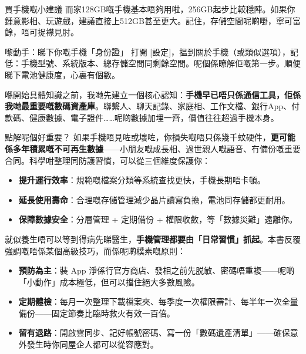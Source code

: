\begin{tcbinfo}{買手機嘅小建議}
而家128GB嘅手機基本唔夠用啦，256GB起步比較穩陣。如果你鍾意影相、玩遊戲，建議直接上512GB甚至更大。記住，存儲空間呢啲嘢，寧可富餘，唔可捉襟見肘。

\end{tcbinfo}

\begin{tcbpractice}{嚟動手：睇下你嘅手機「身份證」}
打開 [設定]，揾到關於手機（或類似選項），記低：手機型號、系統版本、總存儲空間同剩餘空間。呢個係瞭解佢嘅第一步。順便睇下電池健康度，心裏有個數。

\end{tcbpractice}


喺開始具體知識之前，我哋先建立一個核心認知：\textbf{手機早已唔只係通信工具，佢係我哋最重要嘅數碼資產庫}。聯繫人、聊天記錄、家庭相、工作文檔、銀行App、付款碼、健康數據、電子證件……呢啲數據加埋一齊，價值往往超過手機本身。

\begin{tcbinfo}{點解呢個好重要？}
如果手機唔見咗或壞咗，你損失嘅唔只係幾千蚊硬件，\textbf{更可能係多年積累嘅不可再生數據}——小朋友嘅成長相、過世親人嘅語音、冇備份嘅重要合同。科學咁整理同防護習慣，可以從三個維度保護你：

\begin{itemize}
  \item \textbf{提升運行效率}：規範嘅檔案分類等系統查找更快，手機長期唔卡頓。
  \item \textbf{延長使用壽命}：合理嘅存儲管理減少晶片讀寫負擔，電池同存儲都更耐用。
  \item \textbf{保障數據安全}：分層管理 + 定期備份 + 權限收斂，等「數據災難」遠離你。
\end{itemize}

\end{tcbinfo}


就似養生唔可以等到得病先睇醫生，\textbf{手機管理都要由「日常習慣」抓起}。本書反覆強調嘅唔係某個高級技巧，而係呢啲樸素嘅原則：

\begin{itemize}
  \item \textbf{預防為主}：裝 App 淨係行官方商店、發相之前先脱敏、密碼唔重複——呢啲「小動作」成本極低，但可以擋住絕大多數風險。
  \item \textbf{定期體檢}：每月一次整理下載檔案夾、每季度一次權限審計、每半年一次全量備份——固定節奏比臨時救火有效一百倍。
  \item \textbf{留有退路}：開啟雲同步、記好帳號密碼、寫一份「數碼遺產清單」——確保意外發生時你同屋企人都可以從容應對。
\end{itemize}

